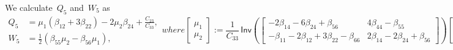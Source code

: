 \documentclass[preprint,10pt,times]{elsarticle}
\numberwithin{equation}{section}
\newcommand{\pr}[1]{\left( #1 \right)}
\newcommand{\Inv}{\,\mathsf{Inv}}
\renewcommand{\>}{$\Rightarrow$}
\begin{document}
We calculate~$Q_5$ and~$W_5$ as
\begin{subequations}
	\begin{align}
	Q_5 & = \mu_1(\beta_{12} + 3\beta_{22})-2\mu_2\beta_{24} + \frac{C_{23}}{C_{33}}, \\
	W_5 & = \frac{1}{2}(\beta_{55}\mu_2 - \beta_{56}\mu_1),
	\end{align}
	where
	\begin{equation}
	\begin{bmatrix}
		\mu_1 \\ \mu_2
	\end{bmatrix} :=
	\frac{1}{C_{33}}
	\Inv \pr{\begin{bmatrix}
		-2\beta_{14}-6\beta_{24}+\beta_{56} & 4\beta_{44}-\beta_{55} \\
		-\beta_{11}-2\beta_{12}+3\beta_{22}-\beta_{66} & 2\beta_{14}-2\beta_{24}+\beta_{56}
	\end{bmatrix}}
	\begin{bmatrix}
			2C_{34} \\ C_{13}-C_{23}
	\end{bmatrix}.
	\end{equation}
\end{subequations}
\end{document}

